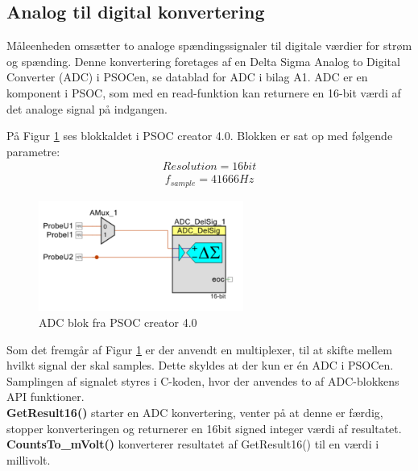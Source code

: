 
\subsection{Analog til digital konvertering}

Måleenheden omsætter to analoge spændingssignaler til digitale værdier for strøm og spænding. Denne konvertering foretages af en Delta Sigma Analog to Digital Converter (ADC) i PSOCen, se datablad for ADC i bilag A1.  ADC er en komponent i PSOC, som med en read-funktion kan returnere en 16-bit værdi af det analoge signal på indgangen. 

På Figur \ref{fig:MEADC} ses blokkaldet i PSOC creator 4.0. Blokken er sat op med følgende parametre:
\begin{align}
Resolution = 16bit
\end{align}
\begin{align}
f_{sample} = 41666 Hz
\end{align}

\begin{figure}[htbp] %
	\centering
	\includegraphics[width=0.6\textwidth]{Figure/MEADC}
	\caption{ADC blok fra PSOC creator 4.0}
	\label{fig:MEADC}
\end{figure}

Som det fremgår af Figur \ref{fig:MEADC} er der anvendt en multiplexer, til at skifte mellem hvilkt signal der skal samples. Dette skyldes at der kun er én ADC i PSOCen. Samplingen af signalet styres i C-koden, hvor der anvendes to af ADC-blokkens API funktioner. 
\\

\textbf{GetResult16() }starter en ADC konvertering, venter på at denne er færdig, stopper konverteringen og returnerer en 16bit signed integer værdi af resultatet. 
\\

\textbf{CountsTo\_mVolt()} konverterer resultatet af GetResult16() til en værdi i millivolt. 
\\

